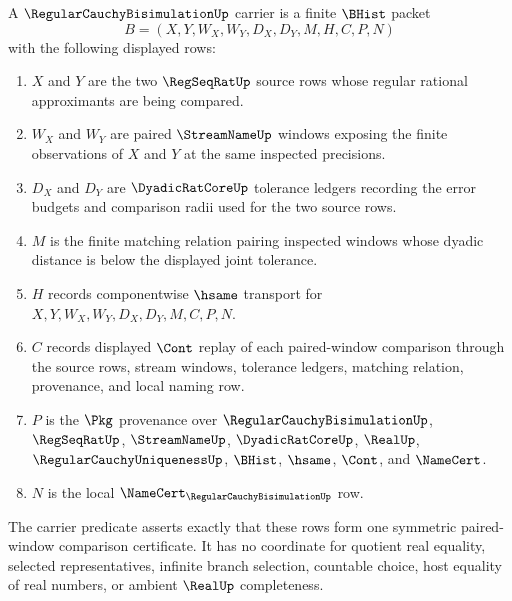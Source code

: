 \begin{definition}
\label{def:regular-cauchy-bisimulation-carrier}
A $\RegularCauchyBisimulationUp$ carrier is a finite $\BHist$ packet
$$
B=(X,Y,W_X,W_Y,D_X,D_Y,M,H,C,P,N)
$$
with the following displayed rows:
\begin{enumerate}
\item $X$ and $Y$ are the two $\RegSeqRatUp$ source rows whose regular rational approximants are being compared.
\item $W_X$ and $W_Y$ are paired $\StreamNameUp$ windows exposing the finite observations of $X$ and $Y$ at the same inspected precisions.
\item $D_X$ and $D_Y$ are $\DyadicRatCoreUp$ tolerance ledgers recording the error budgets and comparison radii used for the two source rows.
\item $M$ is the finite matching relation pairing inspected windows whose dyadic distance is below the displayed joint tolerance.
\item $H$ records componentwise $\hsame$ transport for $X,Y,W_X,W_Y,D_X,D_Y,M,C,P,N$.
\item $C$ records displayed $\Cont$ replay of each paired-window comparison through the source rows, stream windows, tolerance ledgers, matching relation, provenance, and local naming row.
\item $P$ is the $\Pkg$ provenance over $\RegularCauchyBisimulationUp$, $\RegSeqRatUp$, $\StreamNameUp$, $\DyadicRatCoreUp$, $\RealUp$, $\RegularCauchyUniquenessUp$, $\BHist$, $\hsame$, $\Cont$, and $\NameCert$.
\item $N$ is the local $\NameCert_{\RegularCauchyBisimulationUp}$ row.
\end{enumerate}
The carrier predicate asserts exactly that these rows form one symmetric paired-window comparison certificate. It has no coordinate for quotient real equality, selected representatives, infinite branch selection, countable choice, host equality of real numbers, or ambient $\RealUp$ completeness.
\end{definition}

